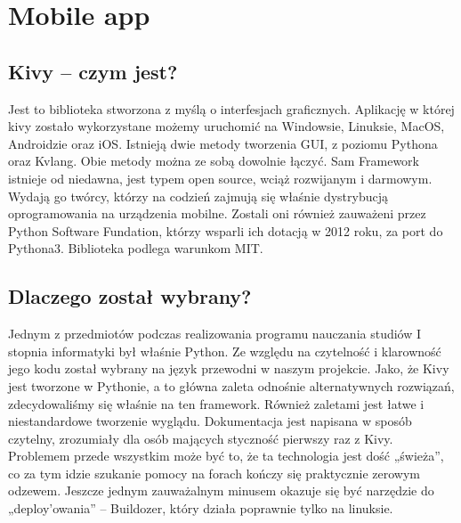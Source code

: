 \documentclass{xmgr}
\begin{document}
\chapter{Mobile app}


\section{Kivy -- czym jest?}
Jest to biblioteka stworzona z myślą o interfesjach graficznych. Aplikację w której kivy zostało wykorzystane możemy uruchomić na 
Windowsie, Linuksie, MacOS, Androidzie oraz iOS. Istnieją dwie metody tworzenia GUI, z poziomu Pythona oraz Kvlang. Obie metody można ze sobą dowolnie łączyć. Sam Framework istnieje od niedawna, jest typem open source, wciąż rozwijanym i darmowym. Wydają go twórcy, którzy na codzień zajmują się właśnie dystrybucją oprogramowania na urządzenia mobilne. Zostali oni również zauważeni przez Python Software Fundation, którzy wsparli ich dotacją w 2012 roku, za port do Pythona3. Biblioteka podlega warunkom MIT.

\section{Dlaczego został wybrany?}
Jednym z przedmiotów podczas realizowania programu nauczania studiów I stopnia informatyki był właśnie Python. Ze względu na czytelność i klarowność jego kodu został wybrany na język przewodni w naszym projekcie. Jako, że Kivy\cite{KivyAuthors:2018:kivy} jest tworzone w Pythonie, a to główna zaleta odnośnie alternatywnych rozwiązań, zdecydowaliśmy się właśnie na ten framework. Również zaletami jest łatwe i niestandardowe tworzenie wyglądu. Dokumentacja jest napisana w sposób czytelny, zrozumiały dla osób mających styczność pierwszy raz z Kivy. Problemem przede wszystkim może być to, że ta technologia jest dość „świeża”, co za tym idzie szukanie pomocy na forach kończy się praktycznie zerowym odzewem. Jeszcze jednym zauważalnym minusem okazuje się być narzędzie do „deploy'owania” -- Buildozer, który działa poprawnie tylko na linuksie.

\end{document}
